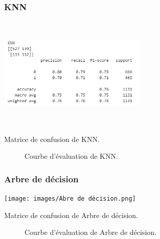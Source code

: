 \subsubsection*{KNN}
\begin{minipage}[t]{0.5\textwidth}
    \begin{table}[H]
        \centering
        \setlength{\fboxsep}{5pt}
        \setlength{\fboxrule}{0.5pt}
        \includegraphics[width=7cm,height=5.37cm]{images/KNN (1).png}
        \caption{Matrice de confusion de KNN.}
    \end{table}
\end{minipage}
\begin{minipage}[t]{0.5\textwidth}
    \begin{figure}[H]
        \centering
        \setlength{\fboxsep}{5pt}
        \setlength{\fboxrule}{0.5pt}
        \caption{Courbe d'évaluation de KNN.}
    \end{figure}
\end{minipage}
\newpage
\subsubsection*{Arbre de décision}
\begin{minipage}[t]{0.5\textwidth}
    \begin{table}[H]
        \centering
        \setlength{\fboxsep}{5pt}
        \setlength{\fboxrule}{0.5pt}
        \texttt{[image: images/Abre de décision.png]}
        \caption{Matrice de confusion de Arbre de décision.}
    \end{table}
\end{minipage}
\begin{minipage}[t]{0.5\textwidth}
    \begin{figure}[H]
        \centering
        \setlength{\fboxsep}{5pt}
        \setlength{\fboxrule}{0.5pt}
        \caption{Courbe d'évaluation de Arbre de décision.}
    \end{figure}
\end{minipage}

